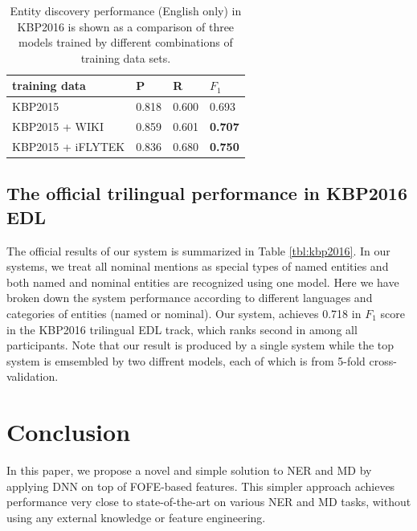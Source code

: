 \documentclass[11pt,a4paper]{article}
\begin{document}
\begin{table}[h]
	\centering
	\begin{tabular}{|l|ll|l|}
		\hline
		training data  &  P   &  R  &  $F_1$ \\ \hline \hline
		KBP2015 &  0.818 & 0.600 & 0.693 \\
		KBP2015 + WIKI  &   0.859 & 0.601 & \bf 0.707 \\	
		KBP2015 + iFLYTEK & 0.836 & 0.680 & \bf 0.750 \\
		\hline
	\end{tabular}
	\caption{Entity discovery performance (English only) in KBP2016 is shown as a comparison of three models trained by different combinations of training data sets. }
	\label{tbl:kbp2016-EDL1}	
\end{table}


\subsection{The official trilingual performance in KBP2016 EDL}


The official results of our system is summarized in Table \ref{tbl:kbp2016}.
In our systems, we treat all nominal mentions as special types of named entities and both named and nominal entities are recognized using one model. Here we have broken down the system performance according to different languages and categories of entities (named or nominal). Our system, achieves 0.718 in $F_1$ score in the KBP2016 trilingual EDL track, which ranks second in among all participants. Note that our result is produced by a single system while the top system is emsembled by two diffrent models, each of which is from 5-fold cross-validation.


\section{Conclusion}

In this paper, we propose a novel and simple solution to NER and MD by applying DNN on top of FOFE-based features.
This simpler approach achieves performance very close to state-of-the-art on various NER and MD tasks, without using any external knowledge or feature engineering.
\end{document}
